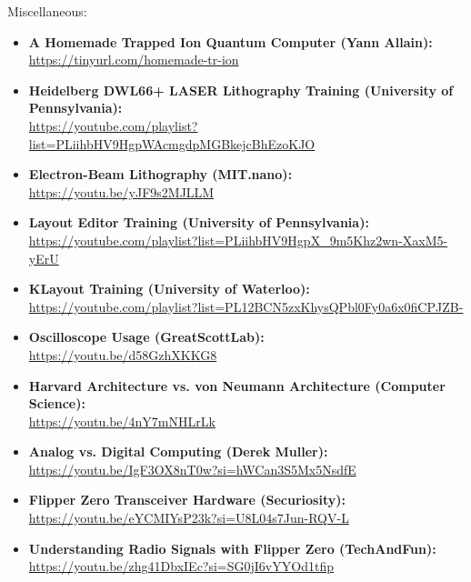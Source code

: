 \space
\newpage

\begin{flushleft}
\large Miscellaneous:
\end{flushleft}

\normalsize\begin{itemize}

  \item\textbf{A Homemade Trapped Ion Quantum Computer (Yann Allain):}\\
\url{https://tinyurl.com/homemade-tr-ion}

  \item\textbf{Heidelberg DWL66+ LASER Lithography Training (University of Pennsylvania):}\\
\url{https://youtube.com/playlist?list=PLiihbHV9HgpWAcmgdpMGBkejcBhEzoKJO}

  \item\textbf{Electron-Beam Lithography (MIT.nano):}\\
\url{https://youtu.be/yJF9s2MJLLM}

  \item\textbf{Layout Editor Training (University of Pennsylvania):}\\
\url{https://youtube.com/playlist?list=PLiihbHV9HgpX_9m5Khz2wn-XaxM5-yErU}

  \item\textbf{KLayout Training (University of Waterloo):}\\
\url{https://youtube.com/playlist?list=PL12BCN5zxKhysQPbl0Fy0a6x0fiCPJZB-}

  \item\textbf{Oscilloscope Usage (GreatScottLab):}\\
\url{https://youtu.be/d58GzhXKKG8}

  \item\textbf{Harvard Architecture vs. von Neumann Architecture (Computer Science):}\\
\url{https://youtu.be/4nY7mNHLrLk}

  \item\textbf{Analog vs. Digital Computing (Derek Muller):}\\
\url{https://youtu.be/IgF3OX8nT0w?si=hWCan3S5Mx5NsdfE}

  \item\textbf{Flipper Zero Transceiver Hardware (Securiosity):}\\
\url{https://youtu.be/eYCMIYsP23k?si=U8L04s7Jun-RQV-L}

  \item\textbf{Understanding Radio Signals with Flipper Zero (TechAndFun):}\\
\url{https://youtu.be/zhg41DbxIEc?si=SG0jI6vYYOd1tfip}


\end{itemize}
